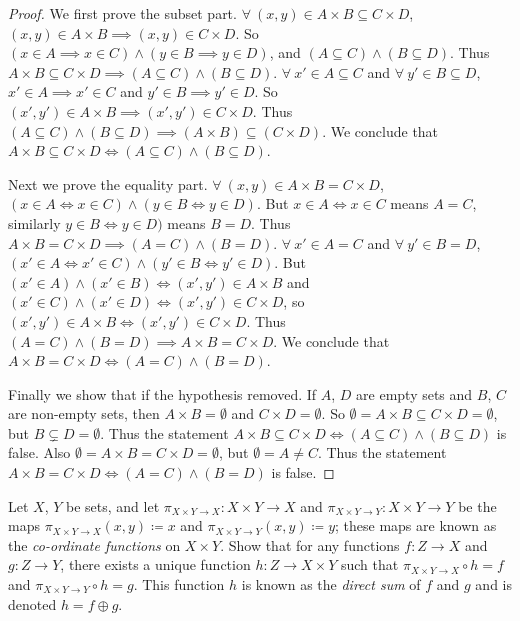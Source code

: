 \begin{proof}
We first prove the subset part.
\(\forall\ (x, y) \in A \times B \subseteq C \times D\), \((x, y) \in A \times B \implies (x, y) \in C \times D\).
So \((x \in A \implies x \in C) \land (y \in B \implies y \in D)\), and \((A \subseteq C) \land (B \subseteq D)\).
Thus \(A \times B \subseteq C \times D \implies (A \subseteq C) \land (B \subseteq D)\).
\(\forall\ x' \in A \subseteq C\) and \(\forall\ y' \in B \subseteq D\), \(x' \in A \implies x' \in C\) and \(y' \in B \implies y' \in D\).
So \((x', y') \in A \times B \implies (x', y') \in C \times D\).
Thus \((A \subseteq C) \land (B \subseteq D) \implies (A \times B) \subseteq (C \times D)\).
We conclude that \(A \times B \subseteq C \times D \iff (A \subseteq C) \land (B \subseteq D)\).

Next we prove the equality part.
\(\forall\ (x, y) \in A \times B = C \times D\), \((x \in A \iff x \in C) \land (y \in B \iff y \in D)\).
But \(x \in A \iff x \in C\) means \(A = C\), similarly \(y \in B \iff y \in D)\) means \(B = D\).
Thus \(A \times B = C \times D \implies (A = C) \land (B = D)\).
\(\forall\ x' \in A = C\) and \(\forall\ y' \in B = D\), \((x' \in A \iff x' \in C) \land (y' \in B \iff y' \in D)\).
But \((x' \in A) \land (x' \in B) \iff (x', y') \in A \times B\) and \((x' \in C) \land (x' \in D) \iff (x', y') \in C \times D\), so \((x', y') \in A \times B \iff (x', y') \in C \times D\).
Thus \((A = C) \land (B = D) \implies A \times B = C \times D\).
We conclude that \(A \times B = C \times D \iff (A = C) \land (B = D)\).

Finally we show that if the hypothesis removed.
If \(A\), \(D\) are empty sets and \(B\), \(C\) are non-empty sets, then \(A \times B = \emptyset\) and \(C \times D = \emptyset\).
So \(\emptyset = A \times B \subseteq C \times D = \emptyset\), but \(B \subsetneq D = \emptyset\).
Thus the statement \(A \times B \subseteq C \times D \iff (A \subseteq C) \land (B \subseteq D)\) is false.
Also \(\emptyset = A \times B = C \times D = \emptyset\), but \(\emptyset = A \neq C\).
Thus the statement \(A \times B = C \times D \iff (A = C) \land (B = D)\) is false.
\end{proof}

\begin{exercise}\label{exercise 3.5.7}
Let \(X\), \(Y\) be sets, and let \(\pi_{X \times Y \to X} : X \times Y \to X\) and \(\pi_{X \times Y \to Y} : X \times Y \to Y\) be the maps \(\pi_{X \times Y \to X}(x, y) \coloneqq x\) and \(\pi_{X \times Y \to Y}(x, y) \coloneqq y\);
these maps are known as the \emph{co-ordinate functions} on \(X \times Y\).
Show that for any functions \(f : Z \to X\) and \(g : Z \to Y\), there exists a unique function \(h : Z \to X \times Y\) such that \(\pi_{X \times Y \to X} \circ h = f\) and \(\pi_{X \times Y \to Y} \circ h = g\).
This function \(h\) is known as the \emph{direct sum} of \(f\) and \(g\) and is denoted \(h = f \oplus g\).
\end{exercise}

